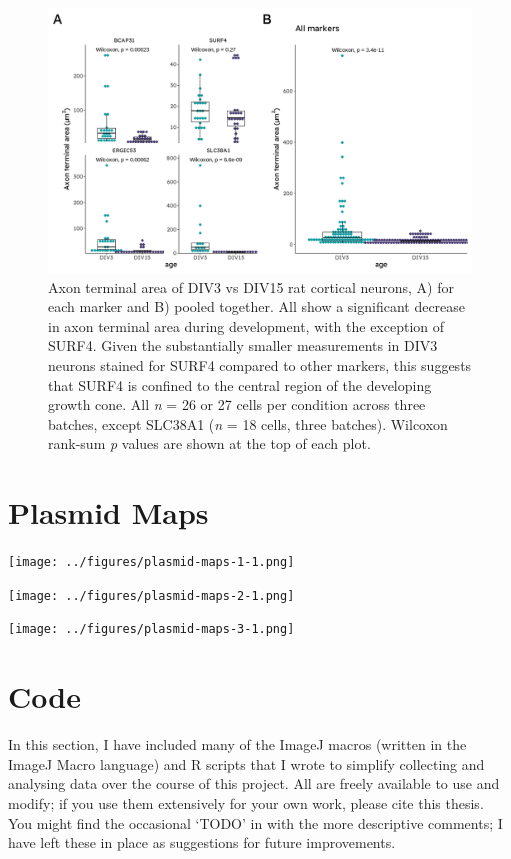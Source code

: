 \documentclass[
  12pt,
  a4paper,
]{book}
\begin{document}
\begin{figure}
\includegraphics{./figures/full/suppl-gc-area-1} \caption[Supplementary figure; axon terminal area in developing cortical neurons]{Axon terminal area of DIV3 vs DIV15 rat cortical neurons, A) for each marker and B) pooled together. All show a significant decrease in axon terminal area during development, with the exception of SURF4. Given the substantially smaller measurements in DIV3 neurons stained for SURF4 compared to other markers, this suggests that SURF4 is confined to the central region of the developing growth cone. All \emph{n} = 26 or 27 cells per condition across three batches, except SLC38A1 (\emph{n} = 18 cells, three batches). Wilcoxon rank-sum \emph{p} values are shown at the top of each plot.}\label{fig:suppl-gc-area}
\end{figure}

\section{Plasmid Maps}\label{plasmid-maps}

\texttt{[image: ../figures/plasmid-maps-1-1.png]}

\texttt{[image: ../figures/plasmid-maps-2-1.png]}

\texttt{[image: ../figures/plasmid-maps-3-1.png]}

\section{Code}\label{CODE}

In this section, I have included many of the ImageJ macros (written in the ImageJ Macro language) and R scripts that I wrote to simplify collecting and analysing data over the course of this project. All are freely available to use and modify; if you use them extensively for your own work, please cite this thesis. You might find the occasional `TODO' in with the more descriptive comments; I have left these in place as suggestions for future improvements.
\end{document}
